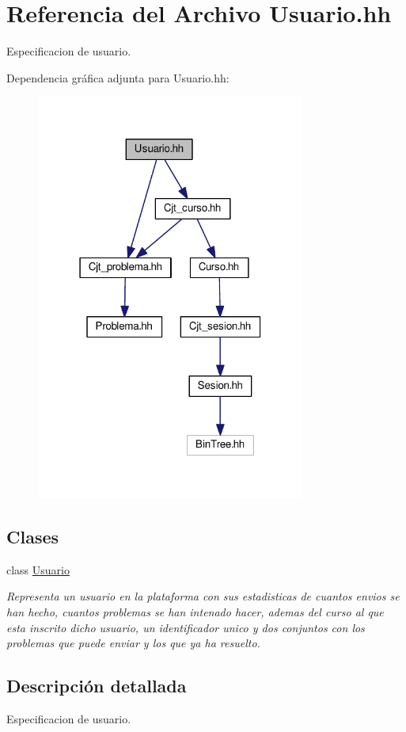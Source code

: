 \hypertarget{_usuario_8hh}{}\section{Referencia del Archivo Usuario.\+hh}
\label{_usuario_8hh}


Especificacion de usuario.  


Dependencia gráfica adjunta para Usuario.\+hh\+:
\nopagebreak
\begin{figure}[H]
\begin{center}
\leavevmode
\includegraphics[width=250pt]{_usuario_8hh__incl}
\end{center}
\end{figure}
\subsection*{Clases}
\begin{DoxyCompactItemize}
\item 
class \mbox{\hyperlink{class_usuario}{Usuario}}
\begin{DoxyCompactList}\small\item\em Representa un usuario en la plataforma con sus estadisticas de cuantos envios se han hecho, cuantos problemas se han intenado hacer, ademas del curso al que esta inscrito dicho usuario, un identificador unico y dos conjuntos con los problemas que puede enviar y los que ya ha resuelto. \end{DoxyCompactList}\end{DoxyCompactItemize}


\subsection{Descripción detallada}
Especificacion de usuario. 

